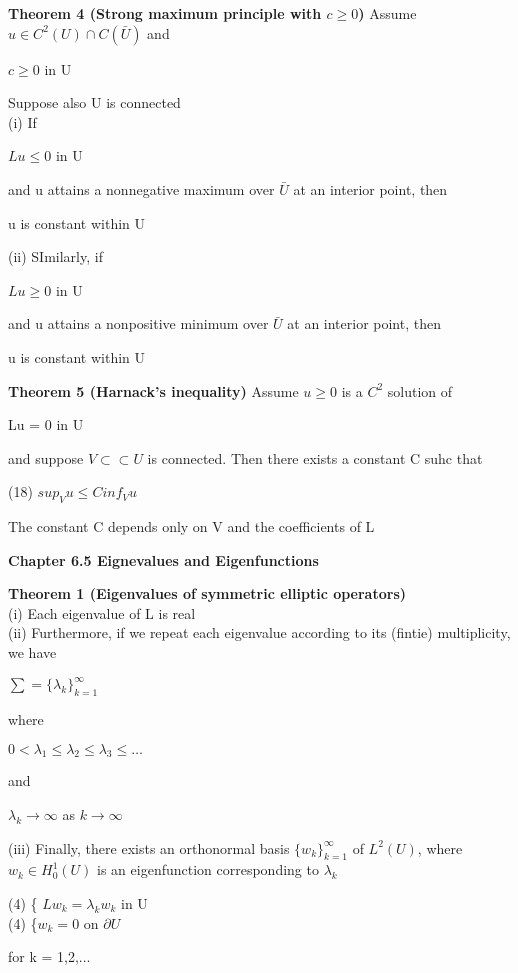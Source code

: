 \documentclass{article}
\newcommand\tab[1][1cm]{\hspace*{#1}}
\begin{document}
\textbf {Theorem 4 (Strong maximum principle with $c \geq 0$)} Assume $u \in C^2(U) \cap C(\bar{U})$ and
\begin{center}
$c \geq 0$ \tab in U
\end{center}
Suppose also U is connected \\
\tab (i) If
\begin{center}
$Lu \leq 0$ \tab in U
\end{center}
and u attains a nonnegative maximum over $\bar{U}$ at an interior point, then
\begin{center}
u is constant within U
\end{center}
\tab (ii) SImilarly, if
\begin{center}
$Lu \geq 0$ \tab in U
\end{center}
and u attains a nonpositive minimum over $\bar{U}$ at an interior point, then
\begin{center}
u is constant within U
\end{center}

\textbf {Theorem 5 (Harnack's inequality)} Assume $u \geq 0$ is a $C^2$ solution of 
\begin{center}
Lu = 0 \tab in U
\end{center}
and suppose $V \subset \subset U$ is connected. Then there exists a constant C suhc that
\begin{center}
(18) \tab $sup_{V} u \leq C inf_{V} u$
\end{center}
The constant C depends only on V and the coefficients of L

\textbf {Chapter 6.5 Eignevalues and Eigenfunctions}

\textbf {Theorem 1 (Eigenvalues of symmetric elliptic operators)} \\ \tab (i) Each eigenvalue of L is real \\
\tab (ii) Furthermore, if we repeat each eigenvalue according to its (fintie) multiplicity, we have
\begin{center}
$\sum = \{\lambda_{k}\}_{k=1}^{\infty}$
\end{center}
where
\begin{center}
$0 < \lambda_{1} \leq \lambda_{2} \leq \lambda_{3} \leq \dots$
\end{center}
and 
\begin{center}
$\lambda_{k} \to \infty$ \tab as $k \to \infty$
\end{center}
\tab (iii) Finally, there exists an orthonormal basis $\{w_{k}\}_{k=1}^{\infty}$ of $L^2(U)$, where $w_{k} \in H_0^1(U)$ is an eigenfunction corresponding to $\lambda_{k}$
\begin{center}
(4) \tab \{ $Lw_{k} = \lambda_{k} w_{k}$ \tab in U \\
(4) \tab \{$w_k = 0$ \tab on $\partial U$
\end{center}
for k = 1,2,...
\end{document}
